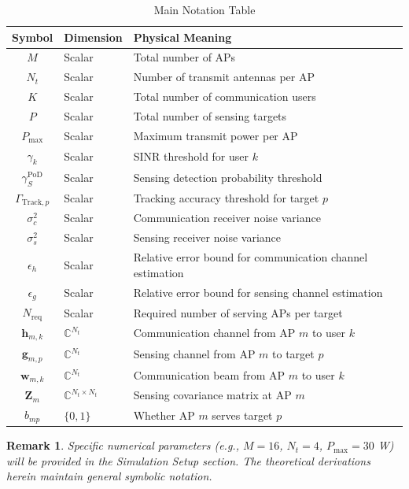 \documentclass[12pt,a4paper]{article}
\newtheorem{remark}{Remark}
\newcommand{\vect}[1]{\mathbf{#1}}
\newcommand{\mat}[1]{\mathbf{#1}}
\begin{document}
\begin{table}[htbp]
\centering
\caption{Main Notation Table}\label{tab:symbols}
\begin{tabular}{cll}
\toprule
Symbol & Dimension & Physical Meaning \\
\midrule
$M$ & Scalar & Total number of APs \\
$N_t$ & Scalar & Number of transmit antennas per AP \\
$K$ & Scalar & Total number of communication users \\
$P$ & Scalar & Total number of sensing targets \\
$P_{\max}$ & Scalar & Maximum transmit power per AP \\
$\gamma_k$ & Scalar & SINR threshold for user $k$ \\
$\gamma_S^{\text{PoD}}$ & Scalar & Sensing detection probability threshold \\
$\Gamma_{\text{Track},p}$ & Scalar & Tracking accuracy threshold for target $p$ \\
$\sigma_c^2$ & Scalar & Communication receiver noise variance \\
$\sigma_s^2$ & Scalar & Sensing receiver noise variance \\
$\epsilon_h$ & Scalar & Relative error bound for communication channel estimation \\
$\epsilon_g$ & Scalar & Relative error bound for sensing channel estimation \\
$N_{\text{req}}$ & Scalar & Required number of serving APs per target \\
$\vect{h}_{m,k}$ & $\mathbb{C}^{N_t}$ & Communication channel from AP $m$ to user $k$ \\
$\vect{g}_{m,p}$ & $\mathbb{C}^{N_t}$ & Sensing channel from AP $m$ to target $p$ \\
$\vect{w}_{m,k}$ & $\mathbb{C}^{N_t}$ & Communication beam from AP $m$ to user $k$ \\
$\mat{Z}_m$ & $\mathbb{C}^{N_t \times N_t}$ & Sensing covariance matrix at AP $m$ \\
$b_{mp}$ & $\{0,1\}$ & Whether AP $m$ serves target $p$ \\
\bottomrule
\end{tabular}
\end{table}

\begin{remark}
Specific numerical parameters (e.g., $M=16$, $N_t=4$, $P_{\max}=30$ W) will be provided in the Simulation Setup section. The theoretical derivations herein maintain general symbolic notation.
\end{remark}
\end{document}

